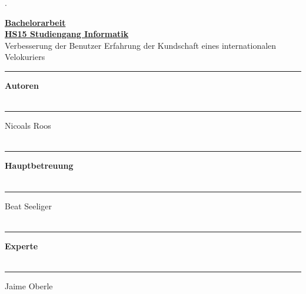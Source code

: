 \begin{titlepage}


\begin{minipage}[b]{0.117\textwidth}
\hskip 0.05cm
\end{minipage}
\begin{minipage}[b]{0.91\textwidth}
\begin{tiny}.\end{tiny}\vskip 2.8cm
	{\huge

	\textbf{\underline{Bachelorarbeit}}\\
	\textbf{\underline{HS15 Studiengang Informatik}}\\

	Verbesserung der Benutzer Erfahrung der Kundschaft eines internationalen Velokuriers
	\vskip 0.5cm}

	\begin{minipage}[b]{0.27\textwidth}
	\hrule\vskip 0.5cm
		\textbf{Autoren}\\
		\\
	\end{minipage}
	\begin{minipage}[b]{0.03\textwidth}
	\hskip 0.5cm
	\end{minipage}
	\begin{minipage}[b]{0.7\textwidth}
	\hrule\vskip 0.5cm
		Nicoals Roos\\
		\\
	\end{minipage}

	\begin{minipage}[b]{0.27\textwidth}
	\hrule\vskip 0.5cm
		\textbf{Hauptbetreuung}\\
		\\
	\end{minipage}
	\begin{minipage}[b]{0.03\textwidth}
	\hskip 0.5cm
	\end{minipage}
	\begin{minipage}[b]{0.7\textwidth}
	\hrule\vskip 0.5cm
		Beat Seeliger\\
		\\
	\end{minipage}

	\begin{minipage}[b]{0.27\textwidth}
	\hrule\vskip 0.5cm
		\textbf{Experte}\\
		\\
	\end{minipage}
	\begin{minipage}[b]{0.03\textwidth}
	\hskip 0.5cm
	\end{minipage}
	\begin{minipage}[b]{0.7\textwidth}
	\hrule\vskip 0.5cm
		Jaime Oberle\\
		\\
	\end{minipage}


\end{minipage}
\end{titlepage}
